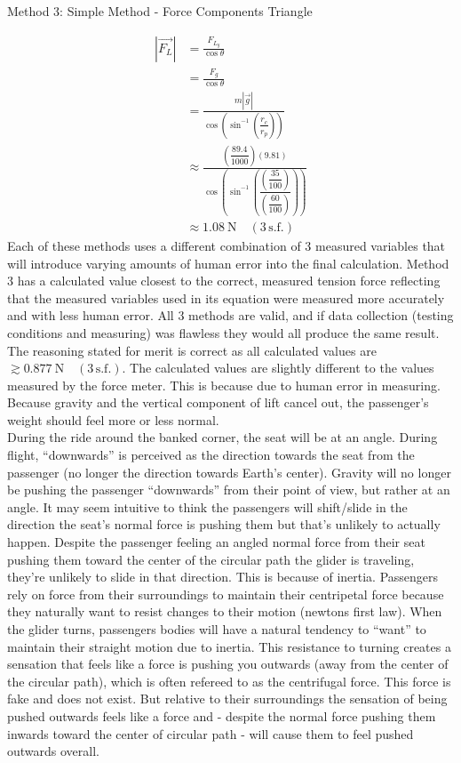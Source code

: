 \documentclass[11pt, a4paper]{article}
\def\ParagraphSpacing{30pt}
\begin{document}
	\begin{center}
		Method 3: Simple Method - Force Components Triangle
	\end{center}
	\begin{align}
		|\vec{F_L}|&=\frac{F_{L_y}}{\cos \theta}\\
		&=\frac{F_g}{\cos \theta}\\
		&=\frac{m|\vec{g}|}{\cos \left(\sin^{-1}\left(\dfrac{r_c}{r_p}\right)\right)}\\
		&\approx\frac{\left(\dfrac{89.4}{1000}\right)(9.81)}{\cos \left(\sin^{-1}\left(\dfrac{\left(\dfrac{35}{100}\right)}{\left(\dfrac{60}{100}\right)}\right)\right)}\\
		&\approx\SI{1.08}{\newton} \quad (3\, \text{s.f.})
	\end{align}
	Each of these methods uses a different combination of 3 measured variables that will introduce varying amounts of human error into the final calculation. Method 3 has a calculated value closest to the correct, measured tension force reflecting that the measured variables used in its equation were measured more accurately and with less human error. All 3 methods are valid, and if data collection (testing conditions and measuring) was flawless they would all produce the same result.\\[\baselineskip]
	The reasoning stated for merit is correct as all calculated values are $\gtrsim\SI{0.877}{\newton} \quad (3\, \text{s.f.})$. The calculated values are slightly different to the values measured by the force meter. This is because due to human error in measuring.\\[\ParagraphSpacing]
	Because gravity and the vertical component of lift cancel out, the passenger's weight should feel more or less normal.\\
	During the ride around the banked corner, the seat will be at an angle. During flight, ``downwards'' is perceived as the direction towards the seat from the passenger (no longer the direction towards Earth's center). Gravity will no longer be pushing the passenger ``downwards'' from their point of view, but rather at an angle. It may seem intuitive to think the passengers will shift/slide in the direction the seat's normal force is pushing them but that's unlikely to actually happen. Despite the passenger feeling an angled normal force from their seat pushing them toward the center of the circular path the glider is traveling, they're unlikely to slide in that direction. This is because of inertia. Passengers rely on force from their surroundings to maintain their centripetal force because they naturally want to resist changes to their motion (newtons first law). When the glider turns, passengers bodies will have a natural tendency to ``want'' to maintain their straight motion due to inertia. This resistance to turning creates a sensation that feels like a force is pushing you outwards (away from the center of the circular path), which is often refereed to as the centrifugal force. This force is fake and does not exist. But relative to their surroundings the sensation of being pushed outwards feels like a force and - despite the normal force pushing them inwards toward the center of circular path - will cause them to feel pushed outwards overall.
	
\end{document}
